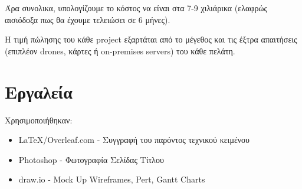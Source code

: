 \documentclass{article}
\begin{document}
Άρα συνολικα, υπολογίζουμε το κόστος να είναι στα 7-9 χιλιάρικα (ελαφρώς αισιόδοξα πως θα έχουμε τελειώσει σε 6 μήνες).

Η τιμή πώλησης του κάθε project εξαρτάται από το μέγεθος και τις έξτρα απαιτήσεις (επιπλέον drones, κάρτες ή on-premises servers) του κάθε πελάτη.

\section{Εργαλεία}
Χρησιμοποιήθηκαν:
\begin{itemize}
    \item \LaTeX/Overleaf.com - Συγγραφή του παρόντος τεχνικού κειμένου
    \item Photoshop - Φωτογραφία Σελίδας Τίτλου
    \item draw.io - Mock Up Wireframes, Pert, Gantt Charts
\end{itemize}
\end{document}
